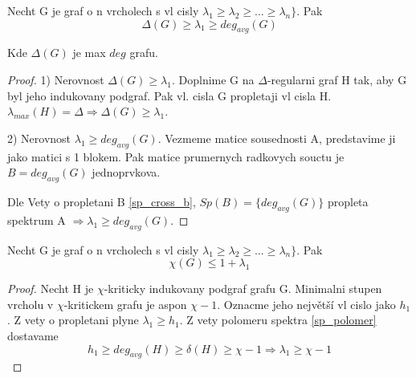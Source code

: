 \begin{theorem}\label{sp_polomer}
	Necht G je graf o n vrcholech s vl cisly $\lambda_1 \geq \lambda_2 \geq ... \geq \lambda_n \}$. Pak
	\[ \Delta(G) \geq \lambda_1 \geq deg_{avg}(G) \]

	Kde $\Delta(G)$ je max $deg$ grafu.
\end{theorem}
\begin{proof}
	1) Nerovnost $\Delta(G) \geq \lambda_1$. Doplnime G na $\Delta$-regularni graf H tak, aby G byl jeho indukovany podgraf. Pak vl. cisla G propletaji vl cisla H. $\lambda_{max}(H) = \Delta \Rightarrow \Delta(G) \geq \lambda_1$.

	2) Nerovnost $\lambda_1 \geq deg_{avg}(G)$.
	Vezmeme matice sousednosti A, predstavime ji jako matici s 1 blokem. Pak matice prumernych radkovych souctu je $B = deg_{avg}(G)$ jednoprvkova.

	Dle Vety o propletani B \cref{sp_cross_b}, $Sp(B) = \{ deg_{avg}(G)\}$ propleta spektrum A $\Rightarrow \lambda_1 \geq deg_{avg}(G)$.
\end{proof}

\begin{theorem}
	Necht G je graf o n vrcholech s vl cisly $\lambda_1 \geq \lambda_2 \geq ... \geq \lambda_n \}$. Pak
	\[ \chi(G) \leq 1 + \lambda_1 \]
\end{theorem}
\begin{proof}
	Necht H je $\chi$-kriticky indukovany podgraf grafu G. Minimalni stupen vrcholu v $\chi$-kritickem grafu je aspon $\chi - 1$.
	Oznacme jeho největší vl cislo jako $h_1$. Z vety o propletani plyne $\lambda_1 \geq h_1$.
	Z vety polomeru spektra \cref{sp_polomer} dostavame
	\[ h_1 \geq deg_{avg}(H) \geq \delta(H) \geq \chi - 1 \Rightarrow \lambda_1 \geq \chi - 1 \]
\end{proof}

